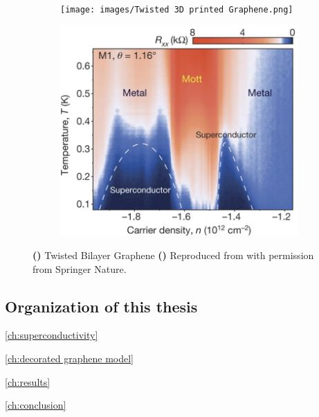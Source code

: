 \documentclass[../notes.tex]{subfiles}
\begin{document}
\begin{figure}
	\begin{subfigure}[b]{0.5\textwidth}
		\centering
		\caption{\hfill\null}\label{sfig:3D printed twisted Graphene}
		\texttt{[image: images/Twisted 3D printed Graphene.png]}
	\end{subfigure}%
	\begin{subfigure}[b]{0.5\textwidth}
		\centering
		\caption{\hfill\null}\label{sfig:unconventional SC MATBG}
		\includegraphics[width=1.0\textwidth]{images/cao_unvoncentional_SC_MATBG.png}
	\end{subfigure}%
	\caption{\textbf{()} Twisted Bilayer Graphene \textbf{()} Reproduced from \cite{caoUnconventionalSuperconductivityMagicangle2018} with permission from Springer Nature.}
\end{figure}

\subsection*{Organization of this thesis}

\cref{ch:superconductivity} 

\cref{ch:decorated graphene model}

\cref{ch:results}

\cref{ch:conclusion}
\end{document}
